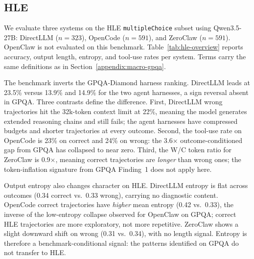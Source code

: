 
\subsection{HLE}
\label{appendix:macro-hle}

We evaluate three systems on the HLE \texttt{multipleChoice} subset using
Qwen3.5-27B: DirectLLM ($n=323$), OpenCode ($n=591$), and ZeroClaw ($n=591$).
OpenClaw is not evaluated on this benchmark.
Table~\ref{tab:hle-overview} reports accuracy, output length, entropy, and
tool-use rates per system.
Terms carry the same definitions as in Section~\ref{appendix:macro-gpqa}.

The benchmark inverts the GPQA-Diamond harness ranking.
DirectLLM leads at 23.5\% versus 13.9\% and 14.9\% for the two agent
harnesses, a sign reversal absent in GPQA.
Three contrasts define the difference.
First, DirectLLM wrong trajectories hit the 32k-token context limit at 22\%,
meaning the model generates extended reasoning chains and still fails; the
agent harnesses have compressed budgets and shorter trajectories at every
outcome.
Second, the tool-use rate on OpenCode is 23\% on correct and 24\% on wrong:
the 3.6$\times$ outcome-conditioned gap from GPQA has collapsed to near zero.
Third, the W/C token ratio for ZeroClaw is 0.9$\times$, meaning correct
trajectories are \emph{longer} than wrong ones; the token-inflation signature
from GPQA Finding~1 does not apply here.

Output entropy also changes character on HLE.
DirectLLM entropy is flat across outcomes (0.34 correct vs.\ 0.33 wrong),
carrying no diagnostic content.
OpenCode correct trajectories have \emph{higher} mean entropy (0.42 vs.\
0.33), the inverse of the low-entropy collapse observed for OpenClaw on GPQA;
correct HLE trajectories are more exploratory, not more repetitive.
ZeroClaw shows a slight downward shift on wrong (0.31 vs.\ 0.34), with no
length signal.
Entropy is therefore a benchmark-conditional signal: the patterns identified
on GPQA do not transfer to HLE.

